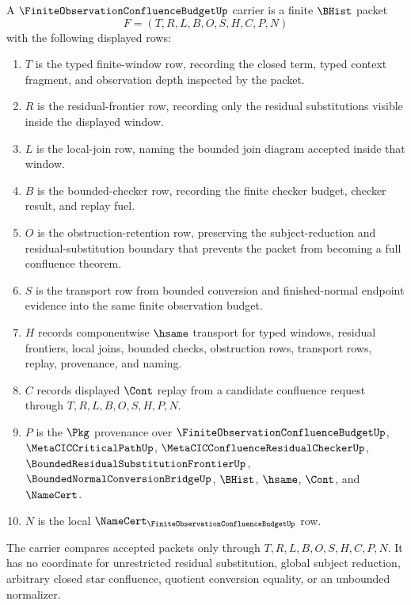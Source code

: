 \begin{definition}
\label{def:finite-observation-confluence-budget-carrier}
A $\FiniteObservationConfluenceBudgetUp$ carrier is a finite $\BHist$ packet
$$
F=(T,R,L,B,O,S,H,C,P,N)
$$
with the following displayed rows:
\begin{enumerate}
\item $T$ is the typed finite-window row, recording the closed term, typed context fragment, and observation depth inspected by the packet.
\item $R$ is the residual-frontier row, recording only the residual substitutions visible inside the displayed window.
\item $L$ is the local-join row, naming the bounded join diagram accepted inside that window.
\item $B$ is the bounded-checker row, recording the finite checker budget, checker result, and replay fuel.
\item $O$ is the obstruction-retention row, preserving the subject-reduction and residual-substitution boundary that prevents the packet from becoming a full confluence theorem.
\item $S$ is the transport row from bounded conversion and finished-normal endpoint evidence into the same finite observation budget.
\item $H$ records componentwise $\hsame$ transport for typed windows, residual frontiers, local joins, bounded checks, obstruction rows, transport rows, replay, provenance, and naming.
\item $C$ records displayed $\Cont$ replay from a candidate confluence request through $T,R,L,B,O,S,H,P,N$.
\item $P$ is the $\Pkg$ provenance over $\FiniteObservationConfluenceBudgetUp$, $\MetaCICCriticalPathUp$, $\MetaCICConfluenceResidualCheckerUp$, $\BoundedResidualSubstitutionFrontierUp$, $\BoundedNormalConversionBridgeUp$, $\BHist$, $\hsame$, $\Cont$, and $\NameCert$.
\item $N$ is the local $\NameCert_{\FiniteObservationConfluenceBudgetUp}$ row.
\end{enumerate}
The carrier compares accepted packets only through $T,R,L,B,O,S,H,C,P,N$. It has no coordinate for unrestricted residual substitution, global subject reduction, arbitrary closed star confluence, quotient conversion equality, or an unbounded normalizer.
\end{definition}

